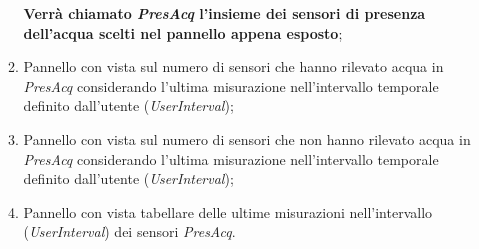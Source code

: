 \begin{enumerate}
\begin{enumerate}
    \textbf{Verrà chiamato \textit{PresAcq} l'insieme dei sensori di presenza dell'acqua scelti nel pannello appena esposto};
    \item Pannello con vista sul numero di sensori che hanno rilevato acqua in \textit{PresAcq} considerando l'ultima misurazione nell'intervallo temporale definito dall'utente (\textit{UserInterval});
    \item Pannello con vista sul numero di sensori che non hanno rilevato acqua in \textit{PresAcq} considerando l'ultima misurazione nell'intervallo temporale definito dall'utente (\textit{UserInterval});
    \item Pannello con vista tabellare delle ultime misurazioni nell'intervallo (\textit{UserInterval}) dei sensori \textit{PresAcq}.
\end{enumerate}
\end{enumerate}


